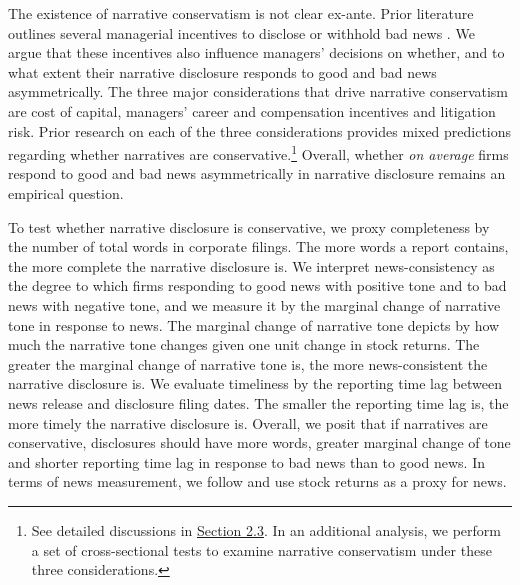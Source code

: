 \documentclass[letterpaper,11pt]{article}
\begin{document}
\begin{spacing}{1.5}
The existence of narrative conservatism is not clear ex-ante. Prior literature outlines several managerial incentives to disclose or withhold bad news \cite{healyInformationAsymmetryCorporate2001, kothariManagersWithholdBad2009, baoManagersDiscloseWithhold2019}. We argue that these incentives also influence managers' decisions on whether, and to what extent their narrative disclosure responds to good and bad news asymmetrically. The three major considerations that drive narrative conservatism are cost of capital, managers' career and compensation incentives and litigation risk. Prior research on each of the three considerations provides mixed predictions regarding whether narratives are conservative.\footnote{See detailed discussions in \hyperref[sec2.3]{Section 2.3}. In an additional analysis, we perform a set of cross-sectional tests to examine narrative conservatism under these three considerations. } Overall, whether \textit{on average} firms respond to good and bad news asymmetrically in narrative disclosure remains an empirical question.

To test whether narrative disclosure is conservative, we proxy completeness by the number of total words in corporate filings. The more words a report contains, the more complete the narrative disclosure is. We interpret news-consistency as the degree to which firms responding to good news with positive tone and to bad news with negative tone, and we measure it by the marginal change of narrative tone in response to news. The marginal change of narrative tone depicts by how much the narrative tone changes given one unit change in stock returns. The greater the marginal change of narrative tone is, the more news-consistent the narrative disclosure is.
We evaluate timeliness by the reporting time lag between news release and disclosure filing dates. The smaller the reporting time lag is, the more timely the narrative disclosure is. Overall, we posit that if narratives are conservative, disclosures should have more words, greater marginal change of tone and shorter reporting time lag in response to bad news than to good news. In terms of news measurement, we follow  and use stock returns as a proxy for news.


\end{spacing}
\end{document}
